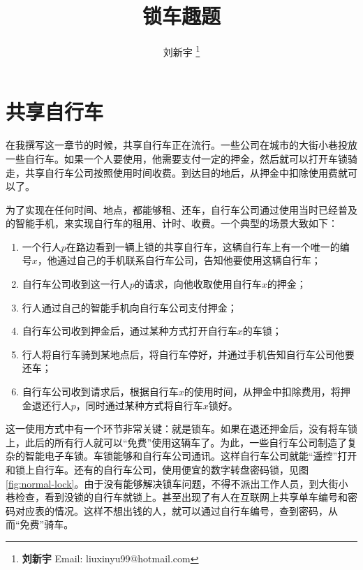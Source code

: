 \documentclass[UTF8]{article}
\begin{document}

\title{锁车趣题}

\author{刘新宇
\thanks{{\bfseries 刘新宇} \newline
  Email: liuxinyu99@hotmail.com \newline}
  }

\maketitle
\fi


\section{共享自行车}

在我撰写这一章节的时候，共享自行车正在流行。一些公司在城市的大街小巷投放一些自行车。如果一个人要使用，他需要支付一定的押金，然后就可以打开车锁骑走，共享自行车公司按照使用时间收费。到达目的地后，从押金中扣除使用费就可以了。

为了实现在任何时间、地点，都能够租、还车，自行车公司通过使用当时已经普及的智能手机，来实现自行车的租用、计时、收费。一个典型的场景大致如下：

\begin{enumerate}
\item 一个行人$p$在路边看到一辆上锁的共享自行车，这辆自行车上有一个唯一的编号$x$，他通过自己的手机联系自行车公司，告知他要使用这辆自行车；
\item 自行车公司收到这一行人$p$的请求，向他收取使用自行车$x$的押金；
\item 行人通过自己的智能手机向自行车公司支付押金；
\item 自行车公司收到押金后，通过某种方式打开自行车$x$的车锁；
\item 行人将自行车骑到某地点后，将自行车停好，并通过手机告知自行车公司他要还车；
\item 自行车公司收到请求后，根据自行车$x$的使用时间，从押金中扣除费用，将押金退还行人$p$，同时通过某种方式将自行车$x$锁好。
\end{enumerate}

这一使用方式中有一个环节非常关键：就是锁车。如果在退还押金后，没有将车锁上，此后的所有行人就可以“免费”使用这辆车了。为此，一些自行车公司制造了复杂的智能电子车锁。车锁能够和自行车公司通讯。这样自行车公司就能“遥控”打开和锁上自行车。还有的自行车公司，使用便宜的数字转盘密码锁，见图\cref{fig:normal-lock}。由于没有能够解决锁车问题，不得不派出工作人员，到大街小巷检查，看到没锁的自行车就锁上。甚至出现了有人在互联网上共享单车编号和密码对应表的情况。这样不想出钱的人，就可以通过自行车编号，查到密码，从而“免费”骑车。
\end{document}
